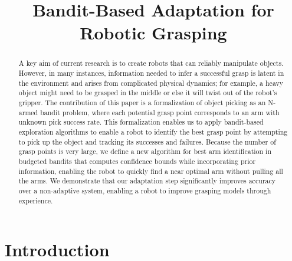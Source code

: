 \documentclass{article}
\title{Bandit-Based Adaptation for Robotic Grasping}
\author{}
\begin{document}
\maketitle

\begin{abstract}
A key aim of current research is to create robots that can reliably
manipulate objects.  However, in many instances, information needed to
infer a successful grasp is latent in the environment and arises from
complicated physical dynamics; for example, a heavy object might need
to be grasped in the middle or else it will twist out of the robot's
gripper.  The contribution of this paper is a formalization of object
picking as an N-armed bandit problem, where each potential grasp point
corresponds to an arm with unknown pick success rate.  This
formalization enables us to apply bandit-based exploration algorithms
to enable a robot to identify the best grasp point by attempting to
pick up the object and tracking its successes and failures.  Because
the number of grasp points is very large, we define a new algorithm
for best arm identification in budgeted bandits that computes
confidence bounds while incorporating prior information, enabling the
robot to quickly find a near optimal arm without pulling all the arms.
We demonstrate that our adaptation step significantly improves
accuracy over a non-adaptive system, enabling a robot to improve
grasping models through experience.





\end{abstract}



\section{Introduction}
\end{document}
